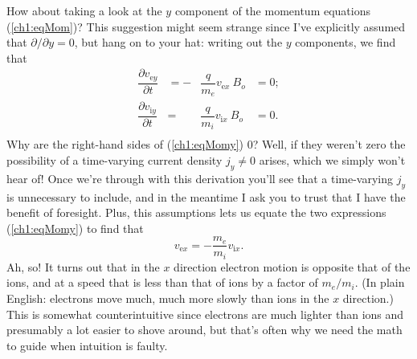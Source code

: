 How about taking a look at the $y$ component of the momentum equations
(\ref{ch1:eqMom})? This suggestion might seem strange since I've explicitly
assumed that $\partial / \partial y = 0$, but hang on to your hat: writing out
the $y$ components, we find that
\begin{equation} 
  \begin{alignedat}{2}
    \label{ch1:eqMomy} \dfrac{\partial v_{\textrm{e}y}}{\partial t} &=
    - &\dfrac{q}{m_e}v_{\textrm{e}x} ~ B_o &= 0; \\
    \dfrac{\partial v_{\textrm{i}y}}{\partial t} &=
    &\dfrac{q}{m_i}v_{\textrm{i}x} ~ B_o &= 0. \\
  \end{alignedat}
\end{equation}
Why are the right-hand sides of (\ref{ch1:eqMomy}) 0? Well, if they weren't zero
the possibility of a time-varying current density $j_y \neq 0$ arises, which we
simply won't hear of! Once we're through with this derivation you'll see that a
time-varying $j_y$ is unnecessary to include, and in the meantime I ask you to
trust that I have the benefit of foresight. Plus, this assumptions lets us
equate the two expressions (\ref{ch1:eqMomy}) to find that
\begin{equation} 
  v_{\textrm{e}x} = - \dfrac{m_e}{m_i} v_{\textrm{i}x}.
\end{equation}
Ah, so! It turns out that in the $x$ direction electron motion is opposite that
of the ions, and at a speed that is less than that of ions by a factor of $m_e /
m_i$. (In plain English: electrons move much, much more slowly than ions in the
$x$ direction.) This is somewhat counterintuitive since electrons are much
lighter than ions and presumably a lot easier to shove around, but that's often why
we need the math to guide when intuition is faulty.

